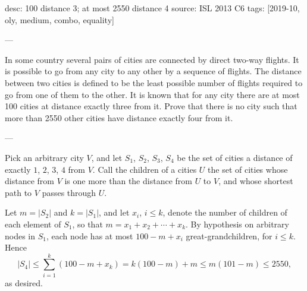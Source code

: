desc: 100 distance 3; at most 2550 distance 4
source: ISL 2013 C6
tags: [2019-10, oly, medium, combo, equality]

---

In some country several pairs of cities are connected by direct two-way flights. It is possible to go from any city to any other by a sequence of flights. The distance between two cities is defined to be the least possible number of flights required to go from one of them to the other. It is known that for any city there are at most 100 cities at distance exactly three from it. Prove that there is no city such that more than 2550 other cities have distance exactly four from it.

---

Pick an arbitrary city $V$, and let $S_1$, $S_2$, $S_3$, $S_4$ be the set of cities a distance of exactly $1$, $2$, $3$, $4$ from $V$. Call the children of a cities $U$ the set of cities whose distance from $V$ is one more than the distance from $U$ to $V$, and whose shortest path to $V$ passes through $U$.

Let $m=|S_2|$ and $k=|S_1|$, and let $x_i$, $i\le k$, denote the number of children of each element of $S_1$, so that $m=x_1+x_2+\cdots+x_k$. By hypothesis on arbitrary nodes in $S_1$, each node has at most $100-m+x_i$ great-grandchildren, for $i\le k$. Hence \[|S_4|\le\sum_{i=1}^k(100-m+x_k)=k(100-m)+m\le m(101-m)\le2550,\]
as desired.
